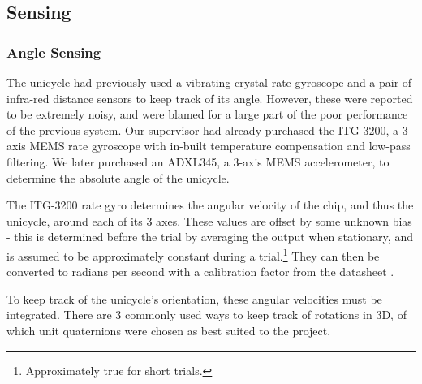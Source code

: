 \documentclass{IIBproject}
\begin{document}
\subsection{Sensing}

\subsubsection{Angle Sensing}

The unicycle had previously used a vibrating crystal rate gyroscope and a pair
of infra-red distance sensors to keep track of its angle. However, these were
reported to be extremely noisy, and were blamed for a large part of the poor
performance of the previous system. Our supervisor had already purchased the
ITG-3200, a 3-axis MEMS rate gyroscope with in-built temperature compensation
and low-pass filtering. We later purchased an ADXL345, a 3-axis MEMS
accelerometer, to determine the absolute angle of the unicycle.

The ITG-3200 rate gyro determines the angular velocity of the chip, and thus
the unicycle, around each of its 3 axes. These values are offset by some
unknown bias - this is determined before the trial by averaging the output
when stationary, and is assumed to be approximately constant during a
trial.\footnote{Approximately true for short trials.} They can then be
converted to radians per second with a calibration factor from the datasheet
\cite{ref:itg3200}.

To keep track of the unicycle's orientation, these angular velocities must be
integrated. There are 3 commonly used ways to keep track of rotations in 3D,
of which unit quaternions were chosen as best suited to the project.
\end{document}
